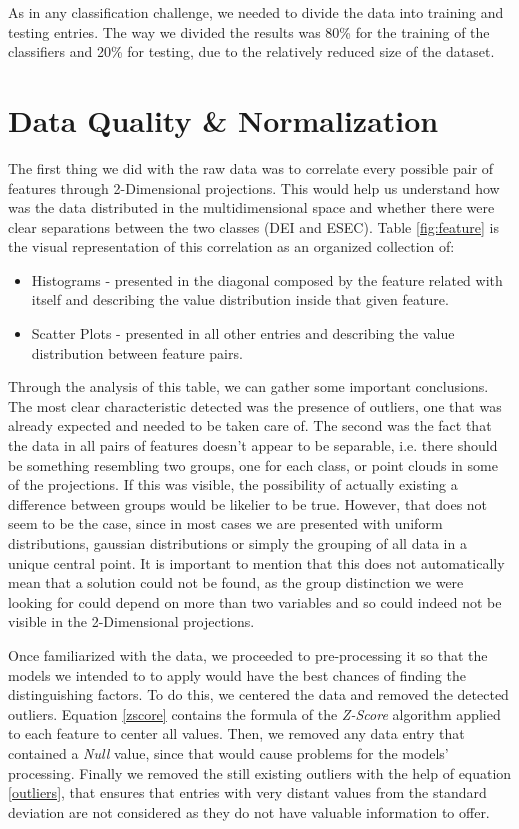 \documentclass[conference]{IEEEtran}
\begin{document}
As in any classification challenge, we needed to divide the data into training 
and testing entries.
The way we divided the results was 80\% for the training of the classifiers and 
20\% for testing, due to the relatively reduced size of the dataset.

\section{Data Quality \& Normalization}\label{data}

The first thing we did with the raw data was to correlate every possible pair 
of features through 2-Dimensional projections.
This would help us understand how was the data distributed in the multidimensional
space and whether there were clear separations between the two classes (DEI and
ESEC).
Table \ref{fig:feature} is the visual representation of this correlation as an 
organized collection of:
\begin{itemize}
\item Histograms - presented in the diagonal composed by the feature related with 
itself and describing the value distribution inside that given feature.
\item Scatter Plots - presented in all other entries and describing the value 
distribution between feature pairs.
\end{itemize}
\vspace{2pt}

Through the analysis of this table, we can gather some important conclusions. 
The most clear characteristic detected was the presence of outliers, one that 
was already expected and needed to be taken care of.
The second was the fact that the data in all pairs of features doesn't appear to 
be separable, i.e. there should be something resembling two groups, one for 
each class, or point clouds in some of the projections.
If this was visible, the possibility of actually existing a difference between 
groups would be likelier to be true.
However, that does not seem to be the case, since in most cases we are presented 
with uniform distributions, gaussian distributions or simply the grouping of all 
data in a unique central point. 
It is important to mention that this does not automatically mean that a solution
could not be found, as the group distinction we were looking for could depend on 
more than two variables and so could indeed not be visible in the 2-Dimensional 
projections.

Once familiarized with the data, we proceeded to pre-processing it so that the 
models we intended to to apply would have the best chances of finding the 
distinguishing factors.
To do this, we centered the data and removed the detected outliers.
Equation \ref{zscore} contains the formula of the \textit{Z-Score} algorithm 
applied to each feature to center all values.
Then, we removed any data entry that contained a \textit{Null} value, since that 
would cause problems for the models' processing.
Finally we removed the still existing outliers with the help of equation 
\ref{outliers}, that ensures that entries with very distant values from the 
standard deviation are not considered as they do not have valuable information
to offer.
\end{document}
